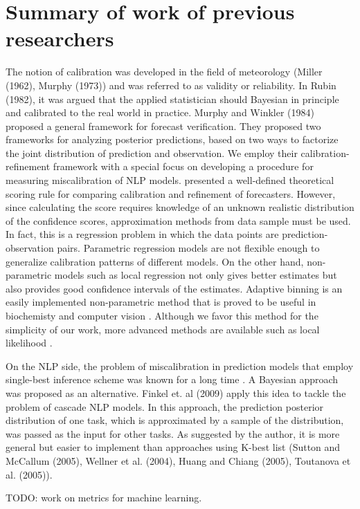 \chapter{Summary of work of previous researchers}
\doublespacenormalsize

The notion of calibration was developed in the field of meteorology (Miller (1962), Murphy (1973)) and was referred to as validity or reliability. In Rubin (1982), it was argued that the applied statistician should Bayesian in principle and calibrated to the real world in practice. Murphy and Winkler (1984) proposed a general framework for forecast verification. They proposed two frameworks for analyzing posterior predictions, based on two ways to factorize the joint distribution of prediction and observation. We employ their calibration-refinement framework with a special focus on developing a procedure for measuring miscalibration of NLP models. \cite{degroot1983comparison} presented a well-defined theoretical scoring rule for comparing calibration and refinement of forecasters. However, since calculating the score requires knowledge of an unknown realistic distribution of the confidence scores, approximation methods from data sample must be used. In fact, this is a regression problem in which the data points are prediction-observation pairs. Parametric regression models are not flexible enough to generalize calibration patterns of different models. On the other hand, non-parametric models such as local regression \citep{wasserman2006all} not only gives better estimates but also provides good confidence intervals of the estimates. Adaptive binning is an easily implemented non-parametric method that is proved to be useful in biochemisty and computer vision \citep{davis2007adaptive, leow2004analysis}. Although we favor this method for the simplicity of our work, more advanced methods are available such as local likelihood \citep{frolich2006non}.  

On the NLP side, the problem of miscalibration in prediction models that employ single-best inference scheme was known for a long time \citep{draper1995assessment}. A Bayesian approach was proposed as an alternative. Finkel et. al (2009) apply this idea to tackle the problem of cascade NLP models. In this approach, the prediction posterior distribution of one task, which is approximated by a sample of the distribution, was passed as the input for other tasks. As suggested by the author, it is more general but easier to implement than approaches using K-best list (Sutton and McCallum (2005), Wellner et al. (2004), Huang and Chiang (2005), Toutanova et al. (2005)).


TODO: work on metrics for machine learning.

